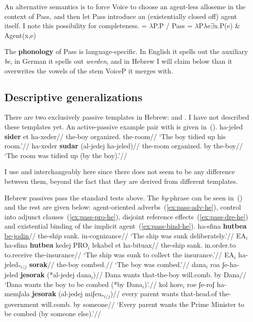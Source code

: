 An alternative semantics is to force Voice to choose an agent-less alloseme in the context of Pass, and then let Pass introduce an (existentially closed off) agent itself. I note this possibility for completeness.
\ex {} = $\lambda$P.P / Pass \trace
\xe
\ex {} = $\lambda$P$\lambda$e$\exists$x.P(e) \& Agent(x,e)
\xe

The \textbf{phonology} of Pass is language-specific. In English it spells out the auxiliary \emph{be}, in German it spells out \emph{werden}, and in Hebrew I will claim below than it overwrites the vowels of the stem VoiceP it merges with.


	\subsection{Descriptive generalizations} \label{passn:pass:tpua}
There are two exclusively passive templates in Hebrew: {\tpua} and {\thuf}. I have not described these templates yet. An active-passive example pair with {\tpua} is given in~(\nextx).
\pex
	\a \begingl
		\gla ha-jeled \textbf{sider} et ha-xeder//
		\glb the-boy organized.  the-room//
		\glft `The boy tidied up his room.'//
	\endgl
	\a \begingl
		\gla ha-xeder \textbf{sudar} (al-jedej ha-jeled)//
		\glb the-room organized. by the-boy//
		\glft `The room was tidied up (by the boy).'//
	\endgl
\xe

I use {\tpua} and {\thuf} interchangeably here since there does not seem to be any difference between them, beyond the fact that they are derived from different templates.

Hebrew passives pass the standard tests above. The \emph{by}-phrase can be seen in~(\lastx) and the rest are given below: agent-oriented adverbs~(\ref{ex:pass-adv-he}), control into adjunct clauses~(\ref{ex:pass-pro-he}), disjoint reference effects~(\ref{ex:pass-dre-he}) and existential binding of the implicit agent~(\ref{ex:pass-bind-he}).
\ex \label{ex:pass-adv-he} \begingl
	\gla ha-sfina \textbf{hutbea} \underline{be-jodin}//
	\glb the-ship sank. in-cognizance//
	\glft `The ship was sunk deliberately.'//
	\endgl
\xe
\ex \label{ex:pass-pro-he} \begingl
	\gla EA$_i$ ha-sfina \textbf{hutbea} kedej PRO$_i$ lekabel et ha-bituax//
	\glb {} the-ship sank. in.order.to {} to.receive  the-insurance//
	\glft `The ship was sunk to collect the insurance.'//
	\endgl
\xe 
\ex \label{ex:pass-dre-he}
	\begingl
	\gla EA$_i$ ha-jeled$_{*i/j}$ \textbf{sorak}//
	\glb {} the-boy combed.//
	\glft `The boy was combed.'//
	\endgl
\xe
\pex \label{ex:pass-bind-he}
	\a \begingl
		\gla dana$_i$ ro{\ts}a ʃe-ha-jeled \textbf{jesorak} (*al-jedej dana$_i$)//
		\glb Dana wants that-the-boy will.comb. by Dana//
		\glft `Dana wants the boy to be combed (*by Dana$_i$)'.//
		\endgl
	\a \begingl
		\gla kol hore$_i$ ro{\ts}e ʃe-roʃ ha-memʃala \textbf{jesorak} (al-jedej miʃeu$_{*i/j}$)//
		\glb every parent wants that-head.of the-government will.comb. by someone//
		\glft `Every parent wants the Prime Minister to be combed (by someone else).'//
		\endgl
\xe


